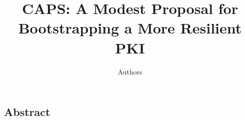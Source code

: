 \documentclass[letterpaper,twocolumn,10pt]{article}
\begin{document}
\date{}

\title{
  CAPS: A Modest Proposal for Bootstrapping a More Resilient PKI
}
\author{
  Authors
}

\maketitle

\thispagestyle{empty}

\subsection*{Abstract}








%

%

%









\footnotesize



\theendnotes
\end{document}
